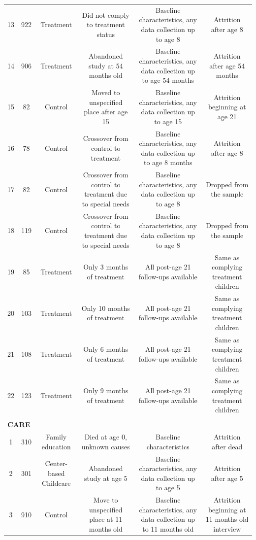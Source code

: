 \begin{appendices}
\begin{table}
\begin{threeparttable}
\begin{tabular}{cccccc}
13 & 922 & Treatment  & Did not comply to treatment status  & Baseline characteristics, any data collection up to age 8 & Attrition after age 8 \\
14 & 906 & Treatment  & Abandoned study at 54 months old  & Baseline characteristics, any data collection up to age 54 months & Attrition after age 54 months \\
15 & 82 & Control       & Moved to unspecified place after age 15 &   Baseline characteristics, any data collection up to age 15 & Attrition beginning at age 21 \\
16 &  78  & Control       & Crossover from control to treatment  & Baseline characteristics, any data collection up to age 8 months & Attrition after age 8 \\
17 &  82 & Control       & Crossover from control to treatment due to special needs & Baseline characteristics, any data collection up to age 8 & Dropped from the sample \\ 
18 & 119 & Control       & Crossover from control to treatment due to special needs & Baseline characteristics, any data collection up to age 8 & Dropped from the sample \\ 
19 & 85 & Treatment         & Only 3 months of treatment  & All post-age 21 follow-ups available   & Same as complying treatment children  \\ 
20 & 103 & Treatment         & Only 10 months of treatment  & All post-age 21 follow-ups available   & Same as complying treatment children  \\ 
21 & 108 & Treatment         & Only 6 months of treatment  & All post-age 21 follow-ups available   & Same as complying treatment children  \\ 
22 & 123 & Treatment         & Only 9 months of treatment  & All post-age 21 follow-ups available   & Same as complying treatment children  \\ \\ \hline
\multicolumn{6}{l}{\textbf{CARE}} \\
1 & 310 & Family education & Died at age 0, unknown causes & Baseline characteristics & Attrition after dead \\
2 & 301 & Center-based Childcare  & Abandoned study at age 5  & Baseline characteristics, any data collection up to age 5 & Attrition after age 5 \\
3 & 910 & Control & Move to unspecified place at 11 months old & Baseline characteristics, any data collection up to 11 months old & Attrition beginning at 11 months old interview \\

\end{tabular}
\end{threeparttable}
\end{table}
\end{appendices}
